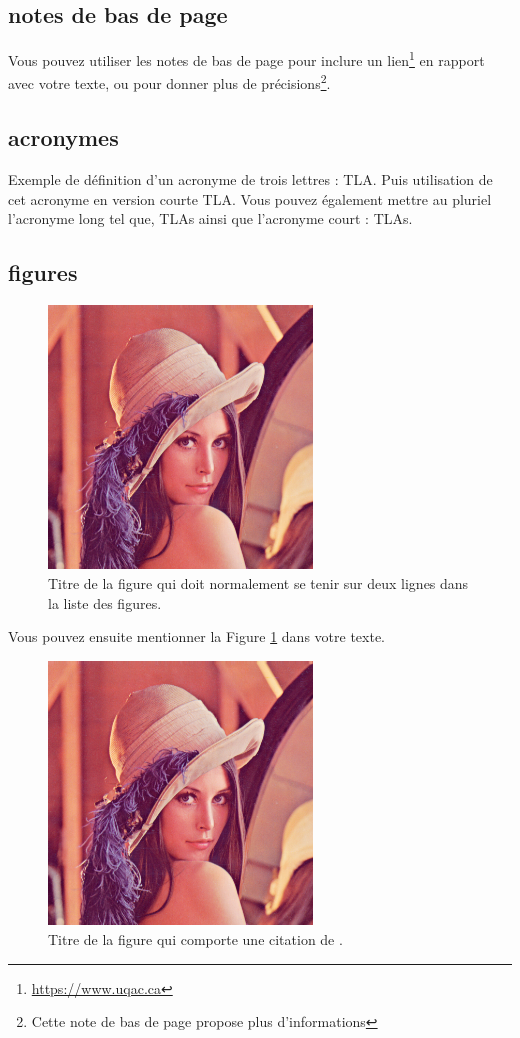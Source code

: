\subsection{notes de bas de page}

Vous pouvez utiliser les notes de bas de page pour inclure un lien\footnote{\url{https://www.uqac.ca}} en rapport avec votre texte, ou pour donner plus de précisions\footnote{Cette note de bas de page propose plus d'informations}.

\subsection{acronymes}

Exemple de définition d'un acronyme de trois lettres : \ac{TLA}. Puis utilisation de cet acronyme en version courte \acs{TLA}. Vous pouvez également mettre au pluriel l'acronyme long tel que, \aclp{TLA} ainsi que l'acronyme court : \acsp{TLA}.

\subsection{figures}

\begin{figure}[H]
 \centering
 \includegraphics[width=7cm]{lenna.png}
 \caption{Titre de la figure qui doit normalement se tenir sur deux lignes dans la liste des figures.}
 \label{fig:figure_long}
\end{figure}

Vous pouvez ensuite mentionner la Figure \ref{fig:figure_long} dans votre texte.

\begin{figure}[H]
  \centering
  \includegraphics[width=7cm]{lenna.png}
  \caption[Titre de la figure sans citation]{Titre de la figure qui comporte une citation de \citet{RN6}.}
  \label{fig:figure_cite}
 \end{figure}

